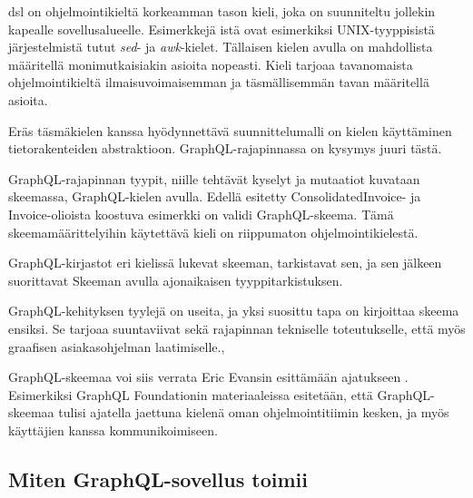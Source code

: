 \Gls{dsl} on ohjelmointikieltä korkeamman tason kieli, joka on
suunniteltu jollekin kapealle sovellusalueelle.\cite{landin1966next}
Esimerkkejä istä ovat esimerkiksi UNIX-tyyppisistä
järjestelmistä tutut \emph{sed}- ja \emph{awk}-kielet. Tällaisen kielen
avulla on mahdollista määritellä monimutkaisiakin asioita
nopeasti.\cite{Raymond2003} Kieli tarjoaa tavanomaista ohjelmointikieltä
ilmaisuvoimaisemman ja täsmällisemmän tavan määritellä asioita.

Eräs täsmäkielen kanssa hyödynnettävä suunnittelumalli on kielen
käyttäminen tietorakenteiden abstraktioon.\cite{Spi00b}
GraphQL-rajapinnassa on kysymys juuri tästä.

GraphQL-rajapinnan tyypit, niille tehtävät kyselyt ja mutaatiot kuvataan
skeemassa, GraphQL-kielen avulla. Edellä esitetty ConsolidatedInvoice-
ja Invoice-olioista koostuva esimerkki on validi GraphQL-skeema. Tämä
skeemamäärittelyihin käytettävä kieli on riippumaton
ohjelmointikielestä.

GraphQL-kirjastot eri kielissä lukevat skeeman, tarkistavat sen, ja sen
jälkeen suorittavat Skeeman avulla ajonaikaisen tyyppitarkistuksen.

GraphQL-kehityksen tyylejä on useita, ja yksi suosittu tapa on
kirjoittaa skeema ensiksi. Se tarjoaa suuntaviivat sekä rajapinnan
tekniselle toteutukselle, että myös graafisen asiakasohjelman
laatimiselle.\cite{SchemaDriven2017Nov},\cite{SchemaDrivenDesign2021Jul}

GraphQL-skeemaa voi siis verrata Eric Evansin esittämään ajatukseen
. Esimerkiksi GraphQL
Foundationin materiaaleissa esitetään, että GraphQL-skeemaa tulisi
ajatella jaettuna kielenä oman ohjelmointitiimin kesken, ja myös
käyttäjien kanssa kommunikoimiseen.\cite{thinkingInGraphs}

\hypertarget{miten-graphql-sovellus-toimii}{%
\subsection{Miten GraphQL-sovellus
toimii}\label{miten-graphql-sovellus-toimii}}

